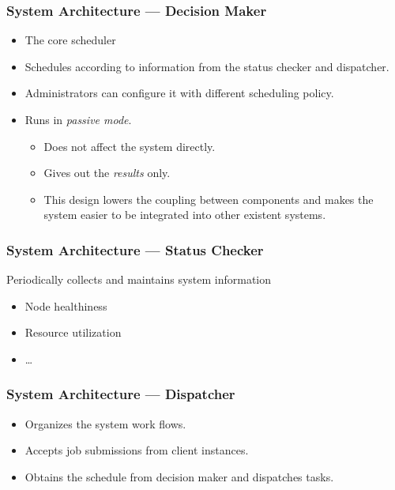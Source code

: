 \begin{frame}
  \frametitle{System Architecture --- Decision Maker}
  \begin{itemize}
    \item The core scheduler
    \item Schedules according to information from the status checker and
      dispatcher.
    \item Administrators can configure it with different scheduling
      policy.
    \item Runs in \emph{passive mode}.
      \begin{itemize}
        \item Does not affect the system directly.
        \item Gives out the \emph{results} only.
        \item This design lowers the coupling between components and
          makes the system easier to be integrated into other existent
          systems.
      \end{itemize}
  \end{itemize}
\end{frame}
\begin{frame}
  \frametitle{System Architecture --- Status Checker}
  Periodically collects and maintains system information
  \begin{itemize}
    \item Node healthiness
    \item Resource utilization
    \item \ldots
  \end{itemize}
\end{frame}
\begin{frame}
  \frametitle{System Architecture --- Dispatcher}
  \begin{itemize}
    \item Organizes the system work flows.
    \item Accepts job submissions from client instances.
    \item Obtains the schedule from decision maker and dispatches
      tasks.
  \end{itemize}
\end{frame}
